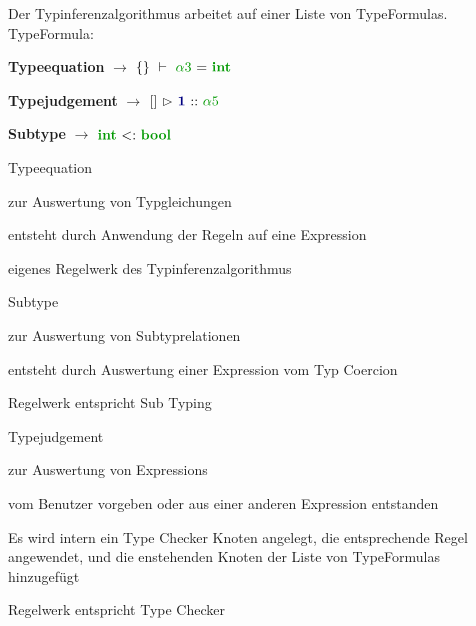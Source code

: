 { 
    \begin{itemgroup}{Der Typinferenzalgorithmus arbeitet auf einer Liste von TypeFormulas. \\[10mm] 
	TypeFormula:\\[-4mm]}
    
    \item \textbf{Typeequation} 	$\to$	$\SeenTypes{}\ \vdash\ \TypeEquationTypeInference
	{\TypeTypeVariable{\alpha3}} {\TypeIntegerType} $ 
    \item \textbf{Typejudgement} $\to$  	 $\TypeJudgement {\TypeEnvironment{}} {\ExprConstant{1}}
    	{\TypeTypeVariable{\alpha5}} $ 
    \item \textbf{Subtype}	$\to$	$\TypeSubType {\TypeIntegerType} {\TypeBooleanType} $  \\[-3mm]

    \end{itemgroup}
}

{ 
    \begin{itemgroup}{Typeequation}
     
	\item zur Auswertung von Typgleichungen
	\item entsteht durch Anwendung der Regeln auf eine Expression 
	\item eigenes Regelwerk des Typinferenzalgorithmus  \\
    \end{itemgroup}
    \begin{itemgroup}{Subtype}	
	\item zur Auswertung von Subtyprelationen
	\item entsteht durch Auswertung einer Expression vom Typ Coercion
	\item Regelwerk entspricht Sub Typing
     \end{itemgroup}
}

{ 
	\begin{itemgroup}{Typejudgement}
	\item zur Auswertung von Expressions 
	\item vom Benutzer vorgeben oder aus einer anderen Expression entstanden
	\item Es wird intern ein Type Checker Knoten angelegt, die entsprechende Regel angewendet,
	   und die enstehenden Knoten der Liste von TypeFormulas hinzugefügt
	\item Regelwerk entspricht Type Checker
     \end{itemgroup}
}